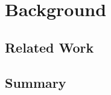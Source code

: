 \chapter{Background} \label{ch:background}

\section{Related Work} \label{sec:bg-related}

\section{Summary} \label{rel:summary}